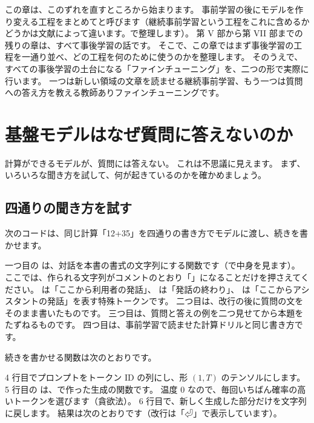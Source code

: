 この章は、このずれを直すところから始まります。
事前学習の後にモデルを作り変える工程をまとめてと呼びます（継続事前学習という工程をこれに含めるかどうかは文献によって違います。で整理します）。
第 V 部から第 VII 部までの残りの章は、すべて事後学習の話です。
そこで、この章ではまず事後学習の工程を一通り並べ、どの工程を何のために使うのかを整理します。
そのうえで、すべての事後学習の土台になる「ファインチューニング」を、二つの形で実際に行います。
一つは新しい領域の文章を読ませる継続事前学習、もう一つは質問への答え方を教える教師ありファインチューニングです。

\section{基盤モデルはなぜ質問に答えないのか}\label{sec:post-why}

計算ができるモデルが、質問には答えない。
これは不思議に見えます。
まず、いろいろな聞き方を試して、何が起きているのかを確かめましょう。

\subsection{四通りの聞き方を試す}

次のコードは、同じ計算「12+35」を四通りの書き方でモデルに渡し、続きを書かせます。


一つ目の  は、対話を本書の書式の文字列にする関数です（で中身を見ます）。
ここでは、作られる文字列がコメントのとおり「」になることだけを押さえてください。
 は「ここから利用者の発話」、 は「発話の終わり」、
 は「ここからアシスタントの発話」を表す特殊トークンです。
二つ目は、改行の後に質問の文をそのまま書いたものです。
三つ目は、質問と答えの例を二つ見せてから本題をたずねるものです。
四つ目は、事前学習で読ませた計算ドリルと同じ書き方です。

続きを書かせる関数は次のとおりです。


4 行目でプロンプトをトークン ID の列にし、形 $(1, T)$ のテンソルにします。
5 行目の  は、で作った生成の関数です。
温度 0 なので、毎回いちばん確率の高いトークンを選びます（貪欲法）。
6 行目で、新しく生成した部分だけを文字列に戻します。
結果は次のとおりです（改行は「⏎」で表示しています）。

